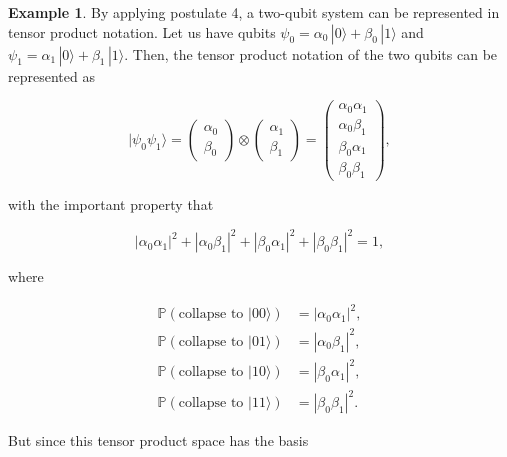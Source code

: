 \documentclass{article}
\theoremstyle{definition}
\newtheorem{example}{Example}[section]
\begin{document}
    \begin{example}
      By applying postulate 4, a two-qubit system can be represented in tensor product notation. Let us have qubits $\psi_0 = \alpha_0 \, |0\rangle + \beta_0 \, |1\rangle$ and $\psi_1 = \alpha_1 \, |0\rangle + \beta_1 \, |1\rangle$. Then, the tensor product notation of the two qubits can be represented as

        \[|\psi_0 \psi_1 \rangle = \begin{pmatrix} \alpha_0 \\ \beta_0 \end{pmatrix} \otimes \begin{pmatrix} \alpha_1 \\ \beta_1 \end{pmatrix} = \begin{pmatrix} \alpha_0 \alpha_1 \\ \alpha_0 \beta_1 \\ \beta_0 \alpha_1 \\ \beta_0 \beta_1 \end{pmatrix},\]

      with the important property that

        \[|\alpha_0 \alpha_1|^2 + |\alpha_0 \beta_1|^2 + |\beta_0 \alpha_1|^2 + |\beta_0 \beta_1|^2 = 1,\]

      where

      \begin{align*}
        \mathbb{P}(\text{collapse to } |00\rangle) & = |\alpha_0 \alpha_1|^2, \\
        \mathbb{P}(\text{collapse to } |01\rangle) & = |\alpha_0 \beta_1|^2, \\
        \mathbb{P}(\text{collapse to } |10\rangle) & = |\beta_0 \alpha_1|^2, \\
        \mathbb{P}(\text{collapse to } |11\rangle) & = |\beta_0 \beta_1|^2.
      \end{align*}

      But since this tensor product space has the basis


\end{example}
\end{document}
